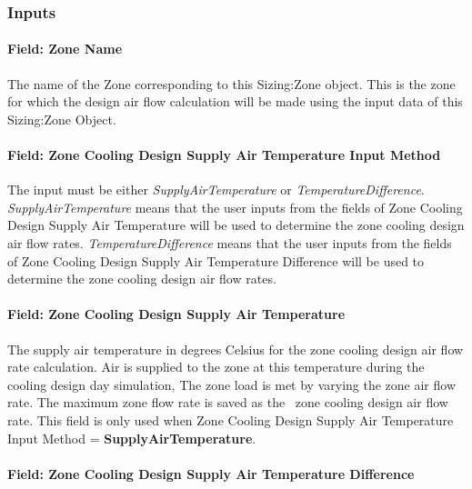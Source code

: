 \subsubsection{Inputs}\label{inputs-4-008}

\paragraph{Field: Zone Name}\label{field-zone-name-004}

The name of the Zone corresponding to this Sizing:Zone object. This is the zone for which the design air flow calculation will be made using the input data of this Sizing:Zone Object.

\paragraph{Field: Zone Cooling Design Supply Air Temperature Input Method}\label{field-zone-cooling-design-supply-air-temperature-input-method}

The input must be either \emph{SupplyAirTemperature} or \emph{TemperatureDifference}. \emph{SupplyAirTemperature} means that the user inputs from the fields of Zone Cooling Design Supply Air Temperature will be used to determine the zone cooling design air flow rates. \emph{TemperatureDifference} means that the user inputs from the fields of Zone Cooling Design Supply Air Temperature Difference will be used to determine the zone cooling design air flow rates.

\paragraph{Field: Zone Cooling Design Supply Air Temperature}\label{field-zone-cooling-design-supply-air-temperature}

The supply air temperature in degrees Celsius for the zone cooling design air flow rate calculation. Air is supplied to the zone at this temperature during the cooling design day simulation, The zone load is met by varying the zone air flow rate. The maximum zone flow rate is saved as the~ zone cooling design air flow rate. This field is only used when Zone Cooling Design Supply Air Temperature Input Method = \textbf{SupplyAirTemperature}.

\paragraph{Field: Zone Cooling Design Supply Air Temperature Difference}\label{field-zone-cooling-design-supply-air-temperature-difference}

